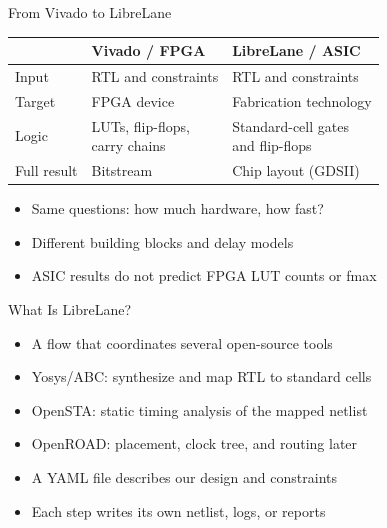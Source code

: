 \begin{frame}{From Vivado to LibreLane}
\begin{center}
\small
\begin{tabular}{lll}
\toprule
 & Vivado / FPGA & LibreLane / ASIC\\
\midrule
Input & RTL and constraints & RTL and constraints\\[1ex]
Target & FPGA device & Fabrication technology\\[1ex]
Logic & \shortstack[l]{LUTs, flip-flops,\\carry chains} & \shortstack[l]{Standard-cell gates\\and flip-flops}\\[1ex]
Full result & Bitstream & Chip layout (GDSII)\\
\bottomrule
\end{tabular}
\end{center}
\begin{itemize}
\item Same questions: how much hardware, how fast?
\item Different building blocks and delay models
\item ASIC results do not predict FPGA LUT counts or fmax
\end{itemize}
\end{frame}

\begin{frame}{What Is LibreLane?}
\begin{itemize}
\item A flow that coordinates several open-source tools
\item Yosys/ABC: synthesize and map RTL to standard cells
\item OpenSTA: static timing analysis of the mapped netlist
\item OpenROAD: placement, clock tree, and routing later
\item A YAML file describes our design and constraints
\item Each step writes its own netlist, logs, or reports
\end{itemize}
\end{frame}

